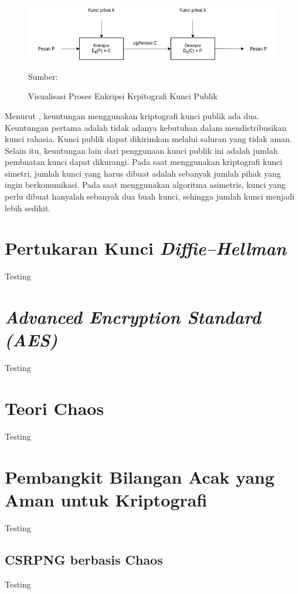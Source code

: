 \begin{figure}[!h]
  \centering
  \includegraphics[width=\textwidth]{chapters/res/chapter-2/img/crypto.symetric.png}
  \caption{Visualisasi Proses Enkripsi Krpitografi Kunci Publik} 
  \label{fig:crypto.asymetric}
  Sumber: \textcite{munir2019}
\end{figure}

Menurut \textcite{munir2019}, keuntungan menggunakan kriptografi kunci publik ada dua. Keuntungan pertama adalah tidak adanya kebutuhan dalam mendistribusikan kunci rahasia. Kunci publik dapat dikirimkan melalui saluran yang tidak aman. Selain itu, keuntungan lain dari penggunaan kunci publik ini adalah jumlah pembuatan kunci dapat dikurangi. Pada saat menggunakan kriptografi kunci simetri, jumlah kunci yang harus dibuat adalah sebanyak jumlah pihak yang ingin berkomunikasi. Pada saat menggunakan algoritma asimetris, kunci yang perlu dibuat hanyalah sebanyak dua buah kunci, sehingga jumlah kunci menjadi lebih sedikit. 

\section{Pertukaran Kunci \emph{Diffie–Hellman}}
Testing 

\section{\emph{Advanced Encryption Standard (AES)}}
Testing

\section{Teori Chaos}
Testing

\section{Pembangkit Bilangan Acak yang Aman untuk Kriptografi}
Testing

\subsection{CSRPNG berbasis Chaos}
Testing

